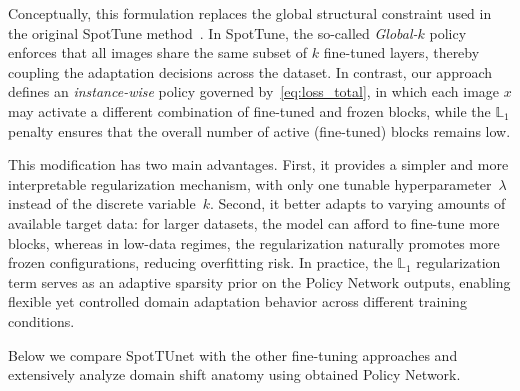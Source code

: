 Conceptually, this formulation replaces the global structural constraint used in the original SpotTune method~\cite{guo2019spottune}. In SpotTune, the so-called \emph{Global-$k$} policy enforces that all images share the same subset of $k$ fine-tuned layers, thereby coupling the adaptation decisions across the dataset. In contrast, our approach defines an \emph{instance-wise} policy governed by~\eqref{eq:loss_total}, in which each image $x$ may activate a different combination of fine-tuned and frozen blocks, while the $\mathbb{L}_1$ penalty ensures that the overall number of active (fine-tuned) blocks remains low.

This modification has two main advantages. First, it provides a simpler and more interpretable regularization mechanism, with only one tunable hyperparameter~$\lambda$ instead of the discrete variable~$k$. Second, it better adapts to varying amounts of available target data: for larger datasets, the model can afford to fine-tune more blocks, whereas in low-data regimes, the regularization naturally promotes more frozen configurations, reducing overfitting risk. In practice, the $\mathbb{L}_1$ regularization term serves as an adaptive sparsity prior on the Policy Network outputs, enabling flexible yet controlled domain adaptation behavior across different training conditions.

Below we compare SpotTUnet with the other fine-tuning approaches and extensively analyze domain shift anatomy using obtained Policy Network.


